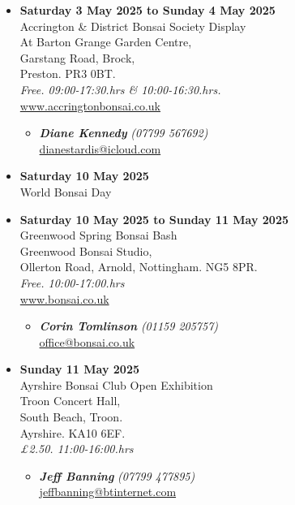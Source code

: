 \begin{itemize}
    \item \textbf{Saturday 3 May 2025 to Sunday 4 May 2025}
    \\
    Accrington \& District Bonsai Society Display \\
    At Barton Grange Garden Centre, \\
    Garstang Road, Brock, \\
    Preston. PR3 0BT.
    \\
    \emph{Free. 09:00-17:30.hrs \& 10:00-16:30.hrs.}
    \\
    \href{https://www.accringtonbonsai.co.uk}{www.accringtonbonsai.co.uk}
    \begin{itemize}
        \item \textbf{\emph{Diane Kennedy}} \emph{(07799 567692)} \\
        \href{mailto:dianestardis@icloud.com}{dianestardis@icloud.com}
    \end{itemize}

    \item \textbf{Saturday 10 May 2025}
    \\
    World Bonsai Day

    \item \textbf{Saturday 10 May 2025 to Sunday 11 May 2025}
    \\
    Greenwood Spring Bonsai Bash \\
    Greenwood Bonsai Studio, \\
    Ollerton Road, Arnold, Nottingham. NG5 8PR.
    \\
    \emph{Free. 10:00-17:00.hrs}
    \\
    \href{https://www.bonsai.co.uk}{www.bonsai.co.uk}
    \begin{itemize}
        \item \textbf{\emph{Corin Tomlinson}} \emph{(01159 205757)} \\
        \href{mailto:office@bonsai.co.uk}{office@bonsai.co.uk}
    \end{itemize}

    \item \textbf{Sunday 11 May 2025}
    \\
    Ayrshire Bonsai Club Open Exhibition \\
    Troon Concert Hall, \\
    South Beach, Troon. \\
    Ayrshire. KA10 6EF.
    \\
    \emph{£2.50. 11:00-16:00.hrs}
    \begin{itemize}
        \item \textbf{\emph{Jeff Banning}} \emph{(07799 477895)} \\
        \href{mailto:jeffbanning@btinternet.com}{jeffbanning@btinternet.com}
    \end{itemize}


\end{itemize}
